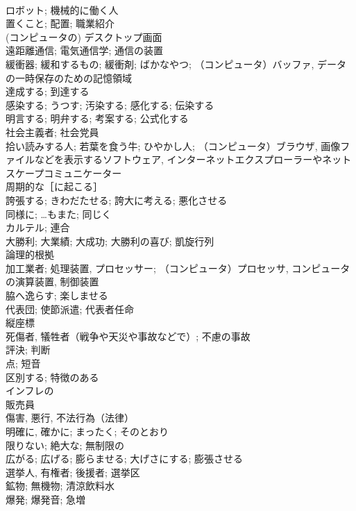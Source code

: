 \documentclass[8pt]{extreport}
\begin{document}
\begin{CJK}{UTF8}{min}
\\	ロボット; 機械的に働く人	
\\	置くこと; 配置; 職業紹介	
\\	(コンピュータの) デスクトップ画面	
\\	遠距離通信; 電気通信学; 通信の装置	
\\	緩衝器; 緩和するもの; 緩衝剤; ばかなやつ; （コンピュータ）バッファ, データの一時保存のための記憶領域	
\\	達成する; 到達する	
\\	感染する; うつす; 汚染する; 感化する; 伝染する	
\\	明言する; 明弁する; 考案する; 公式化する	
\\	社会主義者; 社会党員	
\\	拾い読みする人; 若葉を食う牛; ひやかし人; （コンピュータ）ブラウザ, 画像ファイルなどを表示するソフトウェア, インターネットエクスプローラーやネットスケープコミュニケーター	
\\	周期的な［に起こる］	
\\	誇張する; きわだたせる; 誇大に考える; 悪化させる	
\\	同様に; …もまた; 同じく	
\\	カルテル; 連合	
\\	大勝利; 大業績; 大成功; 大勝利の喜び; 凱旋行列	
\\	論理的根拠	
\\	加工業者; 処理装置, プロセッサー; （コンピュータ）プロセッサ, コンピュータの演算装置, 制御装置	
\\	脇へ逸らす; 楽しませる	
\\	代表団; 使節派遣; 代表者任命	
\\	縦座標	
\\	死傷者, 犠牲者（戦争や天災や事故などで）; 不慮の事故	
\\	評決; 判断	
\\	点; 短音	
\\	区別する; 特徴のある	
\\	インフレの	
\\	販売員	
\\	傷害, 悪行, 不法行為（法律）	
\\	明確に, 確かに; まったく; そのとおり	
\\	限りない; 絶大な; 無制限の	
\\	広がる; 広げる; 膨らませる; 大げさにする; 膨張させる	
\\	選挙人, 有権者; 後援者; 選挙区	
\\	鉱物; 無機物; 清涼飲料水	
\\	爆発; 爆発音; 急増	

\end{CJK}
\end{document}

